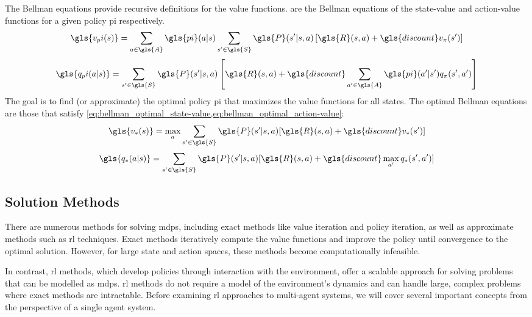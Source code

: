 The Bellman equations provide recursive definitions for the value functions. 
 are the Bellman equations
of the state-value and action-value functions for a given policy \gls{pi} 
respectively.
\begin{equation}
    \gls{v_pi(s)} 
    = \sum_{a \in \gls{A}} \gls{pi}(a|s) 
      \sum_{s^\prime \in \gls{S}} \gls{P}(s^\prime|s, a) \left[
        \gls{R}(s, a) + \gls{discount} v_\pi(s^\prime)\right]
    \label{eq:bellman_state-value}
\end{equation} \begin{equation}
    \gls{q_pi(a|s)} 
    = \sum_{s^\prime \in \gls{S}} \gls{P}(s^\prime|s, a) \left[
        \gls{R}(s, a) + \gls{discount} \sum_{a^\prime \in \gls{A}} 
        \gls{pi}(a^\prime|s^\prime) q_\pi(s^\prime, a^\prime)\right]
    \label{eq:bellman_action-value}
\end{equation}
The goal is to find (or approximate) the optimal policy \gls{pi} that maximizes
the value functions for all states. The optimal Bellman equations are those that
satisfy \cref*{eq:bellman_optimal_state-value,eq:bellman_optimal_action-value}:
\begin{equation}
    \gls{v_*(s)} = \max_a \sum_{s^\prime \in \gls{S}} \gls{P}(s^\prime|s, a)
    [\gls{R}(s, a) + \gls{discount} v_*(s^\prime)]
    \label{eq:bellman_optimal_state-value}
\end{equation} \begin{equation}
    \gls{q_*(a|s)} = \sum_{s^\prime \in \gls{S}} \gls{P}(s^\prime|s, a) 
    [\gls{R}(s, a) + \gls{discount} \max_{a^\prime} q_*(s^\prime, a^\prime)]
    \label{eq:bellman_optimal_action-value}
\end{equation}

    \subsection*{Solution Methods}%

There are numerous methods for solving \glspl{mdp}, including exact methods 
like value iteration and policy iteration, as well as approximate methods 
such as \gls{rl} techniques. Exact methods iteratively compute the value 
functions and improve the policy until convergence to the optimal solution. 
However, for large state and action spaces, 
these methods become computationally infeasible.

In contrast, \gls{rl} methods, which develop policies through interaction
with the environment, offer a scalable approach for solving problems that
can be modelled as \glspl{mdp}. 
\Gls{rl} methods do not require a model of the environment's dynamics and can
handle large, complex problems where exact methods are intractable.
Before examining \gls{rl} approaches to multi-agent systems, we will cover 
several important concepts from the perspective of a single agent system.


